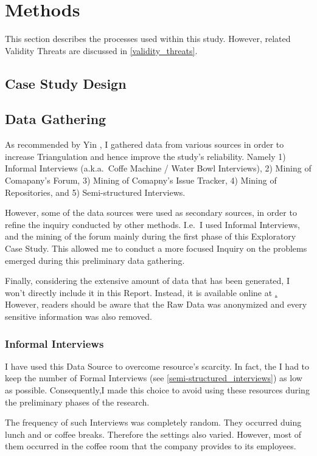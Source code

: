 \chapter{Methods} \label{methods}
This section describes the processes used within this study. However, related Validity Threats are discussed in \ref{validity_threats}.

\section{Case Study Design}

\section{Data Gathering}
As recommended by Yin \cite{case_study_guide}, I gathered data from various sources in order to increase Triangulation and hence improve the study's reliability. Namely 1) Informal Interviews (a.k.a.\ Coffe Machine / Water Bowl Interviews), 2) Mining of Comapany's Forum, 3) Mining of Comapny's Issue Tracker, 4) Mining of Repositories, and 5) Semi-structured Interviews.

However, some of the data sources were used as secondary sources, in order to refine the inquiry conducted by other methods. I.e.\ I used Informal Interviews, and the mining of the forum mainly during the first phase of this Exploratory Case Study. This allowed me to conduct a more focused Inquiry on the problems emerged during this preliminary data gathering.

Finally, considering the extensive amount of data that has been generated, I won't directly include it in this Report. Instead, it is available online at \href{http://somthing/}. However, readers should be aware that the Raw Data was anonymized and every sensitive information was also removed. 

\subsection{Informal Interviews}
I have used this Data Source to overcome resource's scarcity. In fact, the I had to keep the number of Formal Interviews (see \ref{semi-structured_interviews}) as low as possible. Consequently,I made this choice to avoid using these resources during the preliminary phases of the research. 

The frequency of such Interviews was completely random. They occurred duing lunch and or coffee breaks. Therefore the settings also varied. However, most of them occurred in the coffee room that the company provides to its employees.

